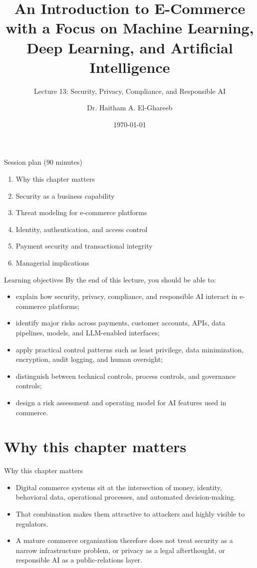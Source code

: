 \documentclass[aspectratio=169]{beamer}
\title[Lecture 13]{An Introduction to E-Commerce\\\small with a Focus on Machine Learning, Deep Learning, and Artificial Intelligence}
\subtitle{Lecture 13: Security, Privacy, Compliance, and Responsible AI}
\author{Dr. Haitham A. El-Ghareeb}
\institute{Faculty of Computers and Information Sciences \\ Mansoura University \\ Egypt}
\date{\today}
\begin{document}
\begin{frame}
  \titlepage
\end{frame}

\begin{frame}{Session plan (90 minutes)}
  \begin{enumerate}
    \item Why this chapter matters
    \item Security as a business capability
    \item Threat modeling for e-commerce platforms
    \item Identity, authentication, and access control
    \item Payment security and transactional integrity
    \item Managerial implications
  \end{enumerate}
\end{frame}

\begin{frame}{Learning objectives}
  By the end of this lecture, you should be able to:
  \begin{itemize}
    \item explain how security, privacy, compliance, and responsible AI interact in e-commerce platforms;
    \item identify major risks across payments, customer accounts, APIs, data pipelines, models, and LLM-enabled interfaces;
    \item apply practical control patterns such as least privilege, data minimization, encryption, audit logging, and human oversight;
    \item distinguish between technical controls, process controls, and governance controls;
    \item design a risk assessment and operating model for AI features used in commerce.
  \end{itemize}
\end{frame}

\section{Why this chapter matters}

\begin{frame}{Why this chapter matters}
  \begin{itemize}
    \item Digital commerce systems sit at the intersection of money, identity, behavioral data, operational processes, and automated decision-making.
    \item That combination makes them attractive to attackers and highly visible to regulators.
    \item A mature commerce organization therefore does not treat security as a narrow infrastructure problem, or privacy as a legal afterthought, or responsible AI as a public-relations layer.
  \end{itemize}
\end{frame}
\end{document}

